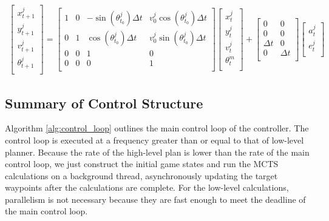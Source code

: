 \begin{multline} \label{eq:lqng_dyn}
\begin{bmatrix}
x^j_{t+1} \\
y^j_{t+1} \\
v^j_{t+1} \\
\theta^j_{t+1} \\
\end{bmatrix} = 
\begin{bmatrix} 
	1 & 0 & -\sin(\theta^j_{t_0})\Delta t & v^j_0\cos(\theta^j_{t_0})\Delta t\\
	0 & 1 & \cos(\theta^j_{t_0})\Delta t & v^j_0\sin(\theta^j_{t_0})\Delta t\\
	0 & 0 & 1 & 0\\
	0 & 0 & 0 & 1\\
	\end{bmatrix}
\begin{bmatrix}
x^j_{t} \\
y^j_{t} \\
v^j_{t} \\
\theta^m_{t} \\
\end{bmatrix}  +
\begin{bmatrix} 
	0 & 0 \\
	0 & 0 \\
	\Delta t & 0 \\
	0 & \Delta t \\
	\end{bmatrix}
	\begin{bmatrix} 
	a^j_t  \\
	e^j_t \\
	\end{bmatrix}
\end{multline}

\subsection{Summary of Control Structure}
Algorithm \ref{alg:control_loop} outlines the main control loop of the controller. The control loop is executed at a frequency greater than or equal to that of low-level planner. Because the rate of the high-level plan is lower than the rate of the main control loop, we just construct the initial game states and run the MCTS calculations on a background thread, asynchronously updating the target waypoints after the calculations are complete. For the low-level calculations, parallelism is not necessary because they are fast enough to meet the deadline of the main control loop. 

